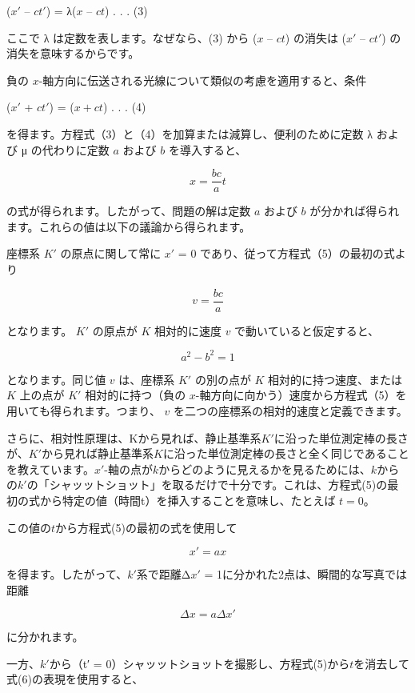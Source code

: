 \documentclass[a4paper,11pt,openany]{ltjsbook}
\begin{document}
($x′$ – $ct′$) = λ($x$ – $ct$) . . . (3)

ここで λ は定数を表します。なぜなら、(3) から ($x$ – $ct$) の消失は ($x′$ – $ct′$) の消失を意味するからです。

負の $x$-軸方向に伝送される光線について類似の考慮を適用すると、条件

($x′$ + $ct′$) = ($x + ct$) . . . (4)

を得ます。方程式（3）と（4）を加算または減算し、便利のために定数 λ および μ の代わりに定数 $a$ および $b$ を導入すると、



\[ x = \frac{bc}{a} t \]



の式が得られます。したがって、問題の解は定数 $a$ および $b$ が分かれば得られます。これらの値は以下の議論から得られます。

座標系 $K′$ の原点に関して常に $x′$ = 0 であり、従って方程式（5）の最初の式より



\[ v = \frac{bc}{a} \]



となります。 $K′$ の原点が $K$ 相対的に速度 $v$ で動いていると仮定すると、



\[ a^2 - b^2 = 1 \]



となります。同じ値 $v$ は、座標系 $K′$ の別の点が $K$ 相対的に持つ速度、または $K$ 上の点が $K′$ 相対的に持つ（負の $x$-軸方向に向かう）速度から方程式（5）を用いても得られます。つまり、 $v$ を二つの座標系の相対的速度と定義できます。

さらに、相対性原理は、Kから見れば、静止基準系$K′$に沿った単位測定棒の長さが、$K′$から見れば静止基準系$K$に沿った単位測定棒の長さと全く同じであることを教えています。$x′$-軸の点が$k$からどのように見えるかを見るためには、$k$からの$k′$の「シャッットショット」を取るだけで十分です。これは、方程式(5)の最初の式から特定の値（時間t）を挿入することを意味し、たとえば $t = 0$。

この値の$t$から方程式(5)の最初の式を使用して

\[ x' = ax \]

を得ます。したがって、$k′$系で距離Δ$x′$ = 1に分かれた2点は、瞬間的な写真では距離

\[
\Delta x = a \Delta x'
\]

に分かれます。

一方、$k′$から（t′ = 0）シャッットショットを撮影し、方程式(5)から$t$を消去して式(6)の表現を使用すると、
\end{document}
